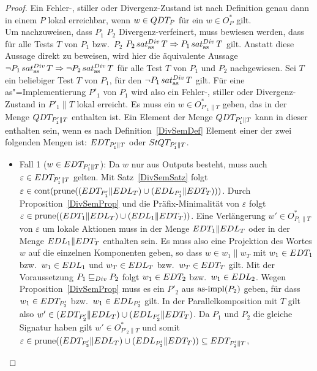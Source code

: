 \begin{proof}
  Ein Fehler-, stiller oder Divergenz-Zustand ist nach Definition genau dann in
  einem \MEIO{} $P$ lokal erreichbar, wenn $w\in QDT _P$ für ein $w\in O_P^*$
  gilt.\\
  Um nachzuweisen, dass $P_1$ $P_2$ Divergenz-verfeinert, muss bewiesen werden,
  dass für alle Tests $T$ von $P_1$ bzw.\ $P_2$ $P_2\hspace{0.05cm}sat_\mathrm{as}^{Div}\hspace{0.05cm} T \Rightarrow P_1
  \hspace{0.05cm}sat_\mathrm{as}^{Div}\hspace{0.05cm} T$ gilt. Anstatt diese Aussage direkt zu beweisen, wird hier die
  äquivalente Aussage $\neg P_1\hspace{0.05cm}sat_\mathrm{as}^{Div}\hspace{0.05cm} T\Rightarrow\neg P_2\hspace{0.05cm}sat_\mathrm{as}^{Div}\hspace{0.05cm} T$ für alle
  Test $T$ von $P_1$ und $P_2$ nachgewiesen. Sei $T$ ein beliebiger Test $T$ von
  $P_1$, für den $\neg P_1\hspace{0.05cm}sat_\mathrm{as}^{Div}\hspace{0.05cm} T$ gilt. Für eine as"=Implementierung $P'_1$
  von $P_1$ wird also ein Fehler-, stiller oder Divergenz-Zustand in $P'_1\|T$
  lokal erreicht. Es muss ein $w\in O_{P'_1\|T}^*$ geben, das in der Menge
  $QDT _{P'_1\|T}$ enthalten ist. Ein Element der Menge $QDT _{P'_1\|T}$ kann
  in dieser enthalten sein, wenn es nach Definition~\ref{DivSemDef} Element
  einer der zwei folgenden Mengen ist: $EDT _{P'_1\|T}$ oder $StQT _{P'_1\|T}$.
  \begin{itemize}
    \item Fall 1 ($w\in EDT _{P'_1\|T}$): Da $w$ nur aus Outputs besteht, muss
      auch $\varepsilon\in EDT _{P'_1\|T}$ gelten. Mit Satz~\ref{DivSemSatz}
      folgt $\varepsilon\in\mathrm{cont} (\mathrm{prune} ((EDT _{P'_1}\|EDL _T)\cup (EDL
      _{P'_1}\|EDT _T)))$. Durch Proposition~\ref{DivSemProp} und die
      Präfix-Minimalität von $\varepsilon$ folgt $\varepsilon\in\mathrm{prune} ((EDT
      _1\|EDL _T)\cup (EDL _1\|EDT _T))$. Eine Verlängerung $w'\in
      O_{P_1\|T}^*$ von $\varepsilon$ um lokale Aktionen muss in der Menge
      $EDT _1\|EDL _T$ oder in der Menge $EDL _1\|EDT _T$ enthalten sein.
      Es muss also eine Projektion des Wortes $w$ auf die einzelnen Komponenten
      geben, so dass $w\in w_1\|w_T$ mit $w_1\in EDT _1$ bzw.\ $w_1\in EDL _1$
      und $w_T\in EDL _T$ bzw.\ $w_T\in EDT _T$ gilt. Mit der Voraussetzung
      $P_1  \sqsubseteq  _{Div} P_2$ folgt $w_1\in EDT _2$ bzw.\ $w_1\in EDL _2$. Wegen
      Proposition~\ref{DivSemProp} muss es ein $P'_2$ aus $\mathrm{as}\text{-}\mathrm{impl} (P_2)$ geben,
      für dass $w_1\in EDT _{P'_2}$ bzw.\ $w_1\in EDL _{P'_2}$ gilt. In der
      Parallelkomposition mit $T$ gilt also $w'\in (EDT _{P'_2}\|EDL _T)\cup
      (EDL _{P'_2}\|EDT _T)$. Da $P_1$ und $P_2$ die gleiche Signatur haben
      gilt $w'\in O _{P'_2\|T}^*$ und somit $\varepsilon\in\mathrm{prune} ((EDT
      _{P'_2}\|EDL _T)\cup (EDL _{P'_2}\|EDT _T))\subseteq EDT _{P'_2\|T}$,

\end{itemize}
\end{proof}
